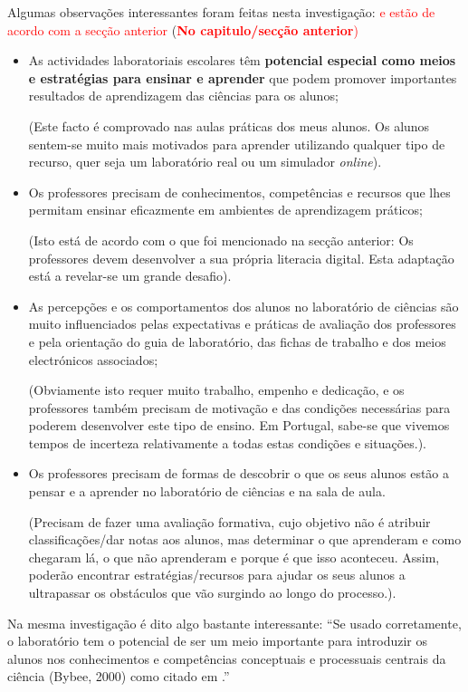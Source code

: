 Algumas observações interessantes foram feitas nesta investigação\cite{Hofstein}: \textcolor{red}{e estão de acordo com a secção anterior} (\textcolor{red}{\textbf{No capitulo/secção anterior})}
\begin{itemize}
\item As actividades laboratoriais escolares têm \textbf{potencial especial como meios e estratégias para ensinar e aprender} que podem promover importantes resultados de aprendizagem das ciências para os alunos;

(Este facto é comprovado nas aulas práticas dos meus alunos. Os alunos sentem-se muito mais motivados para aprender utilizando qualquer tipo de recurso, quer seja um laboratório real ou um simulador \textit{online}).
\item Os professores precisam de conhecimentos, competências e recursos que lhes permitam ensinar eficazmente em ambientes de aprendizagem práticos;

(Isto está de acordo com o que foi mencionado na secção anterior: Os professores devem desenvolver a sua própria literacia digital. Esta adaptação está a revelar-se um grande desafio).
\item As percepções e os comportamentos dos alunos no laboratório de ciências são muito influenciados pelas expectativas e práticas de avaliação dos professores e pela orientação do guia de laboratório, das fichas de trabalho e dos meios electrónicos associados;

(Obviamente isto requer muito trabalho, empenho e dedicação, e os professores também precisam de motivação e das condições necessárias para poderem desenvolver este tipo de ensino. Em Portugal, sabe-se que vivemos tempos de incerteza relativamente a todas estas condições e situações.).

\item Os professores precisam de formas de descobrir o que os seus alunos estão a pensar e a aprender no laboratório de ciências e na sala de aula.

(Precisam de fazer uma avaliação formativa, cujo objetivo não é atribuir classificações/dar notas aos alunos, mas determinar o que aprenderam e como chegaram lá, o que não aprenderam e porque é que isso aconteceu. Assim, poderão encontrar estratégias/recursos para ajudar os seus alunos a ultrapassar os obstáculos que vão surgindo ao longo do processo.).
\end{itemize}

Na mesma investigação é dito algo bastante interessante: ``Se usado corretamente, o laboratório tem o potencial de ser um meio importante para introduzir os alunos nos conhecimentos e competências conceptuais e processuais centrais da ciência (Bybee, 2000) como citado em \cite{Hofstein}.''

